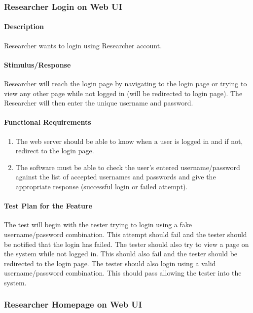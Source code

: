 \documentclass{article}
\begin{document}
\subsubsection{Researcher Login on Web UI}\label{sec: Researcher Login}

\paragraph{Description}
Researcher wants to login using Researcher account.

\paragraph{Stimulus/Response}
Researcher will reach the login page by navigating to the login page or trying to view any other page while not logged in (will be redirected to login page).  The Researcher will then enter the unique username and password.

\paragraph{Functional Requirements}
\begin{enumerate}
\item The web server should be able to know when a user is logged in and if not, redirect to the login page.
\item The software must be able to check the user's entered username/password against the list of accepted usernames and passwords and give the appropriate response (successful login or failed attempt).
\end{enumerate}

\paragraph{Test Plan for the Feature}
The test will begin with the tester trying to login using a fake username/password combination.  This attempt should fail and the tester should be notified that the login has failed.  The tester should also try to view a page on the system while not logged in.  This should also fail and the tester should be redirected to the login page.  The tester should also login using a valid username/password combination.  This should pass allowing the tester into the system.


\subsubsection{Researcher Homepage on Web UI}\label{sec: Researcher Homepage}
\end{document}
